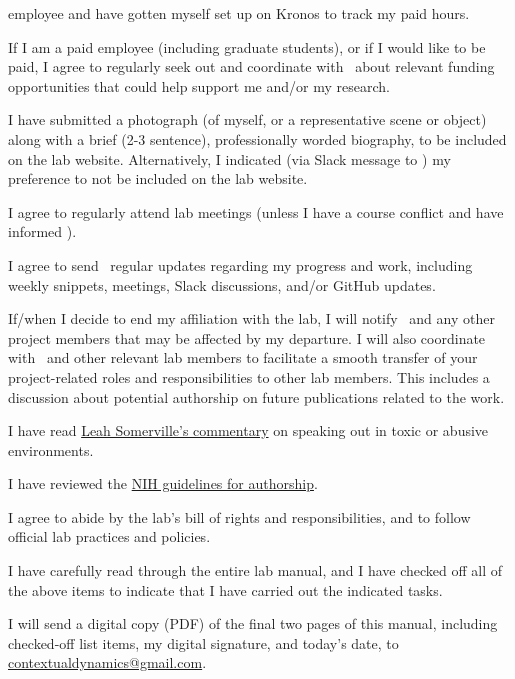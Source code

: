 \documentclass{tufte-book} %
\begin{document}
\begin{todolist}
    employee and have gotten myself set up on Kronos to track my paid
    hours.
    \item If I am a paid employee (including graduate students), or if
      I would like to be paid, I agree to regularly seek out and
      coordinate with \director~about relevant funding opportunities
      that could help support me and/or my research.
  \item I have submitted a photograph (of myself, or a representative
    scene or object) along with a brief (2-3 sentence), professionally
    worded biography, to be included on the lab website.
    Alternatively, I indicated (via Slack message to \coordinator) my
    preference to not be included on the lab website.
  \item I agree to regularly attend lab meetings (unless I have a
    course conflict and have informed \director).
    \item I agree to send \director~regular updates regarding my
      progress and work, including weekly snippets, meetings, Slack
      discussions, and/or GitHub updates.
      \item If/when I decide to end my affiliation with the lab, I
        will notify \director~and any other project members that may
        be affected by my departure.  I will also coordinate with
        \director~and other relevant lab members to facilitate a smooth
        transfer of your project-related roles and responsibilities to
        other lab members.  This includes a discussion about potential
        authorship on future publications related to the work.
  \item I have read
    \href{https://www.sciencemag.org/careers/2018/11/what-can-we-learn-dartmouth}{Leah
      Somerville's commentary} on speaking out in toxic or abusive
    environments.
  \item I have reviewed the
    \href{https://oir.nih.gov/sites/default/files/uploads/sourcebook/documents/ethical_conduct/guidelines-authorship_contributions.pdf}{NIH
      guidelines for authorship}.
  \item I agree to abide by the lab's bill of rights and
    responsibilities, and to follow official lab practices and
    policies.
  \item I have carefully read through the entire lab manual, and I
    have checked off all of the above items to indicate that I have
    carried out the indicated tasks.
  \item I will send a digital copy (PDF) of the final two pages of
    this manual, including checked-off list items, my digital
    signature, and today's date, to
    \href{mailto:contextualdynamics@gmail.com}{contextualdynamics@gmail.com}.
\end{todolist}
\end{document}
